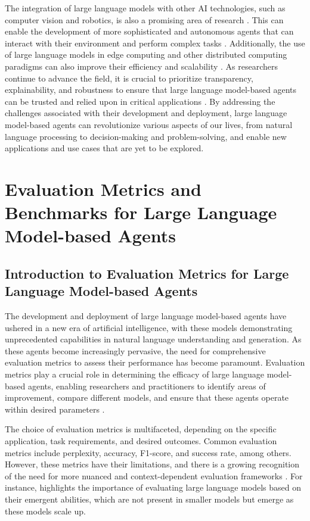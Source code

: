 \documentclass[11pt,a4paper]{article}
\begin{document}
The integration of large language models with other AI technologies, such as computer vision and robotics, is also a promising area of research \cite{doi:10.1109/mnet.2024.3435752}. This can enable the development of more sophisticated and autonomous agents that can interact with their environment and perform complex tasks \cite{arxiv:2402.12914}. Additionally, the use of large language models in edge computing and other distributed computing paradigms can also improve their efficiency and scalability \cite{doi:10.1109/mnet.2025.3539338}. As researchers continue to advance the field, it is crucial to prioritize transparency, explainability, and robustness to ensure that large language model-based agents can be trusted and relied upon in critical applications \cite{arxiv:2404.01023}. By addressing the challenges associated with their development and deployment, large language model-based agents can revolutionize various aspects of our lives, from natural language processing to decision-making and problem-solving, and enable new applications and use cases that are yet to be explored.


\section{Evaluation Metrics and Benchmarks for Large Language Model-based Agents}



\subsection{Introduction to Evaluation Metrics for Large Language Model-based Agents}


The development and deployment of large language model-based agents have ushered in a new era of artificial intelligence, with these models demonstrating unprecedented capabilities in natural language understanding and generation. As these agents become increasingly pervasive, the need for comprehensive evaluation metrics to assess their performance has become paramount. Evaluation metrics play a crucial role in determining the efficacy of large language model-based agents, enabling researchers and practitioners to identify areas of improvement, compare different models, and ensure that these agents operate within desired parameters \cite{doi:10.1145/3641289}. 

The choice of evaluation metrics is multifaceted, depending on the specific application, task requirements, and desired outcomes. Common evaluation metrics include perplexity, accuracy, F1-score, and success rate, among others. However, these metrics have their limitations, and there is a growing recognition of the need for more nuanced and context-dependent evaluation frameworks \cite{arxiv:2402.06196}. For instance, \cite{arxiv:2206.07682} highlights the importance of evaluating large language models based on their emergent abilities, which are not present in smaller models but emerge as these models scale up.
\end{document}
